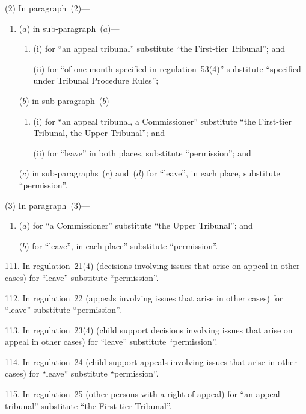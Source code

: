 \documentclass[12pt,a4paper]{article}
\begin{document}
(2) In paragraph~(2)—
\begin{enumerate}\item[]
($a$) in sub-paragraph~($a$)—
\begin{enumerate}\item[]
(i) for “an appeal tribunal” substitute “the First-tier Tribunal”; and

(ii) for “of one month specified in regulation~53(4)” substitute “specified under Tribunal Procedure Rules”;
\end{enumerate}

($b$) in sub-paragraph~($b$)—
\begin{enumerate}\item[]
(i) for “an appeal tribunal, a Commissioner” substitute “the First-tier Tribunal, the Upper Tribunal”; and

(ii) for “leave” in both places, substitute “permission”; and
\end{enumerate}

($c$) in sub-paragraphs~($c$)  and~($d$)  for “leave”, in each place, substitute “permission”.
\end{enumerate}

(3) In paragraph~(3)—
\begin{enumerate}\item[]
($a$) for “a Commissioner” substitute “the Upper Tribunal”; and

($b$) for “leave”, in each place” substitute “permission”.
\end{enumerate}

\medskip

111.  In regulation~21(4) (decisions involving issues that arise on appeal in other cases) for “leave” substitute “permission”.

\medskip

112.  In regulation~22 (appeals involving issues that arise in other cases) for “leave” substitute “permission”.

\medskip

113.  In regulation~23(4) (child support decisions involving issues that arise on appeal in other cases) for “leave” substitute “permission”.

\medskip

114.  In regulation~24 (child support appeals involving issues that arise in other cases) for “leave” substitute “permission”.

\medskip

115.  In regulation~25 (other persons with a right of appeal) for “an appeal tribunal” substitute “the First-tier Tribunal”.
\end{document}

